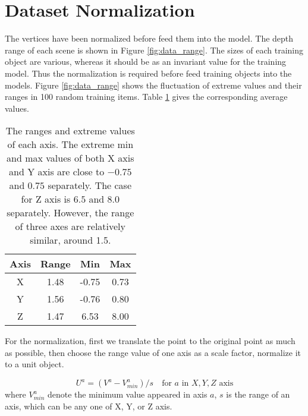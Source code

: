 \section{Dataset Normalization}

The vertices have been normalized before feed them into the model. The depth range of each scene is shown in Figure \ref{fig:data_range}.
The sizes of each training object are various, whereas it should be as an invariant value for the training model. Thus the normalization is required before feed training objects into the models. Figure \ref{fig:data_range} shows the fluctuation of extreme values and their ranges in 100 random training items. Table \ref{tab:data_range} gives the corresponding average values.

\begin{table}[!h]
	\centering
	\begin{tabular}{|c|c|c|c|}
		\hline
		Axis & Range & Min & Max\\
		\hline
		X & 1.48 & -0.75 & 0.73\\
		Y & 1.56 & -0.76 & 0.80\\
		Z & 1.47 & 6.53 & 8.00\\
		\hline
	\end{tabular}
	\caption{The ranges and extreme values of each axis. The extreme min and max values of both X axis and Y axis are close to $ -0.75 $ and $ 0.75 $ separately. The case for Z axis is $ 6.5 $ and $ 8.0 $ separately. However, the range of three axes are relatively similar, around 1.5. 
	}
	\label{tab:data_range}
\end{table}


For the normalization, first we translate the point to the original point as much as possible, then choose the range value of one axis as a scale factor, normalize it to a unit object. 

\begin{equation}\label{eq:normalization}
	U^a = (V^a - V^a_{min}) / s  \quad  \text{for } a \text{ in }  X,Y,Z \text{ axis}
\end{equation}
where $ V^a_{min} $ denote the minimum value appeared in axis $ a $, $ s $ is the range of an axis, which can be any one of X, Y, or Z axis.
